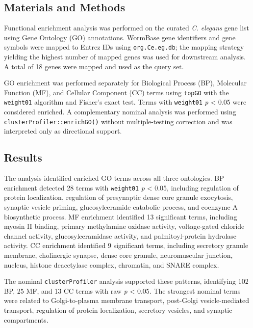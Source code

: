 \documentclass[
  11pt,
]{article}
\begin{document}
\subsection{Materials and Methods}\label{materials-and-methods}

Functional enrichment analysis was performed on the curated \emph{C.
elegans} gene list using Gene Ontology (GO) annotations. WormBase gene
identifiers and gene symbols were mapped to Entrez IDs using
\texttt{org.Ce.eg.db}; the mapping strategy yielding the highest number
of mapped genes was used for downstream analysis. A total of 18 genes
were mapped and used as the query set.

GO enrichment was performed separately for Biological Process (BP),
Molecular Function (MF), and Cellular Component (CC) terms using
\texttt{topGO} with the \texttt{weight01} algorithm and Fisher's exact
test. Terms with \texttt{weight01} \emph{p} \textless{} 0.05 were
considered enriched. A complementary nominal analysis was performed
using \texttt{clusterProfiler::enrichGO()} without multiple-testing
correction and was interpreted only as directional support.

\subsection{Results}\label{results}

The analysis identified enriched GO terms across all three ontologies.
BP enrichment detected 28 terms with \texttt{weight01} \emph{p}
\textless{} 0.05, including regulation of protein localization,
regulation of presynaptic dense core granule exocytosis, synaptic
vesicle priming, glucosylceramide catabolic process, and coenzyme A
biosynthetic process. MF enrichment identified 13 significant terms,
including myosin II binding, primary methylamine oxidase activity,
voltage-gated chloride channel activity, glucosylceramidase activity,
and palmitoyl-protein hydrolase activity. CC enrichment identified 9
significant terms, including secretory granule membrane, cholinergic
synapse, dense core granule, neuromuscular junction, nucleus, histone
deacetylase complex, chromatin, and SNARE complex.

The nominal \texttt{clusterProfiler} analysis supported these patterns,
identifying 102 BP, 25 MF, and 13 CC terms with raw \emph{p} \textless{}
0.05. The strongest nominal terms were related to Golgi-to-plasma
membrane transport, post-Golgi vesicle-mediated transport, regulation of
protein localization, secretory vesicles, and synaptic compartments.
\end{document}
